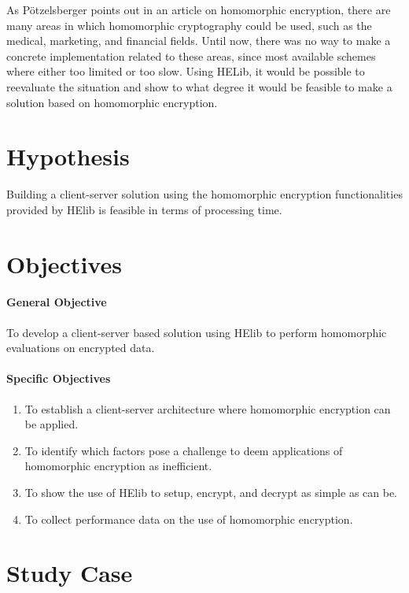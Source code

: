 As P{\"o}tzelsberger \cite{potzelsberger2013kv} points out in an article on homomorphic encryption, there are many areas in which homomorphic cryptography could be used, such as the medical, marketing, and financial fields. Until now, there was no way to make a concrete implementation related to these areas, since most available schemes where either too limited or too slow.  Using HELib, it would be possible to reevaluate the situation and show to what degree it would be feasible to make a solution based on homomorphic encryption.

\section{Hypothesis}

Building a client-server solution using the homomorphic encryption functionalities provided by HElib is feasible in terms of processing time.

\section{Objectives}

\paragraph{General Objective}

To develop a client-server based solution using HElib to perform homomorphic evaluations on encrypted data.

\paragraph{Specific Objectives}
\begin{enumerate}
\item To establish a client-server architecture where homomorphic encryption can be applied.
\item To identify which factors pose a challenge to deem applications of homomorphic encryption as inefficient.
\item To show the use of HElib to setup, encrypt, and decrypt as simple as can be.
\item To collect performance data on the use of homomorphic encryption.
\end{enumerate}

\section{Study Case}

